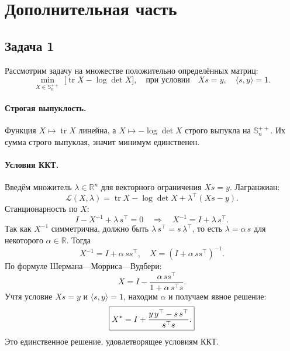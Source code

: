 \documentclass[12pt]{article}
\DeclareMathOperator{\tr}{tr}
\begin{document}
	\section*{Дополнительная часть}
	
	\subsection*{Задача 1}
	Рассмотрим задачу на множестве положительно определённых матриц:
	\[
	\min_{X\in\mathbb S_n^{++}}\;\bigl[\tr X - \log\det X\bigr],
	\quad
	\text{при условии}\quad Xs = y,
	\quad \langle s,y\rangle = 1.
	\]
	
	\paragraph{Строгая выпуклость.}
	Функция $X\mapsto\tr X$ линейна, а $X\mapsto -\log\det X$ строго
	выпукла на $\mathbb S_n^{++}$. Их сумма строго выпуклая, значит
	минимум единственен.
	
	\paragraph{Условия ККТ.}
	Введём множитель $\lambda\in\mathbb R^n$ для векторного ограничения
	$Xs=y$. Лагранжиан:
	\[
	\mathcal L(X,\lambda)
	= \tr X - \log\det X + \lambda^\top(Xs - y).
	\]
	Станционарность по $X$:
	\[
	I - X^{-1} + \lambda\,s^\top = 0
	\quad\Longrightarrow\quad
	X^{-1} = I + \lambda\,s^\top.
	\]
	Так как $X^{-1}$ симметрична, должно быть
	$\lambda\,s^\top = s\,\lambda^\top$, то есть
	$\lambda = \alpha\,s$ для некоторого $\alpha\in\mathbb R$. Тогда
	\[
	X^{-1} = I + \alpha\,ss^\top,
	\quad
	X = (I + \alpha\,ss^\top)^{-1}.
	\]
	По формуле Шермана—Морриса—Вудбери:
	\[
	X = I - \frac{\alpha\,ss^\top}{1 + \alpha\,s^\top s}.
	\]
	Учтя условие $Xs=y$ и $\langle s,y\rangle=1$, находим $\alpha$ и
	получаем явное решение:
	\[
	\boxed{%
		X^* = I + \frac{y\,y^\top - s\,s^\top}{s^\top s}.
	}
	\]
	Это единственное решение, удовлетворящее условиям ККТ.
	
\end{document}
